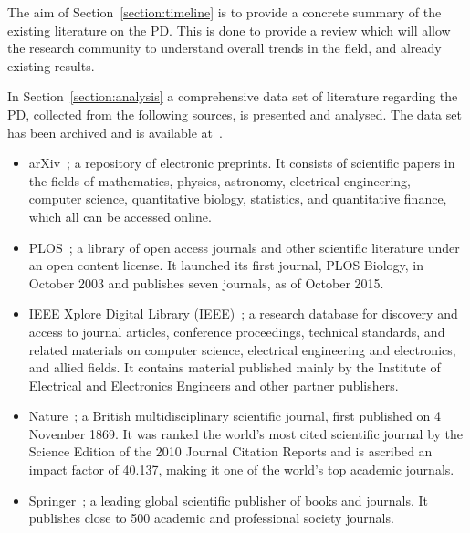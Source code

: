 \documentclass{article}
\theoremstyle{definition}
\begin{document}
The aim of Section~\ref{section:timeline} is to provide a concrete summary of
the existing literature on the PD. This is done to provide a review which will
allow the research community to understand overall trends in the field, and
already existing results.

In Section~\ref{section:analysis} a comprehensive data set of literature
regarding the PD, collected from the following sources, is presented and
analysed. The data set has been archived and is available at~\cite{pd_data_2018}.

\begin{multicols}{2}
    \begin{itemize}
        \item arXiv~\cite{mckiernan2000}; a repository of electronic preprints.
        It consists of scientific
        papers in the fields of mathematics, physics, astronomy, electrical engineering,
        computer science, quantitative biology, statistics, and quantitative finance,
        which all can be accessed online.
        \item PLOS~\cite{plos}; a library of open access journals and other scientific literature
        under an open content license. It launched its first journal, PLOS Biology,
        in October 2003 and publishes seven journals, as of October 2015.
        \item IEEE Xplore Digital Library (IEEE)~\cite{ieee}; a research database for discovery
        and access to journal articles, conference proceedings, technical standards,
        and related materials on computer science, electrical engineering and electronics,
        and allied fields. It contains material published mainly by the Institute of
        Electrical and Electronics Engineers and other partner publishers. 
        \item Nature~\cite{nature}; a British multidisciplinary scientific journal,
        first published on 4 November 1869. It was ranked the world's most cited
        scientific journal by the Science Edition of the 2010 Journal Citation Reports
        and is ascribed an impact factor of 40.137, making it one of the world's
        top academic journals.
        \item Springer~\cite{springer}; a leading global scientific publisher of
        books and journals. It publishes close to 500 academic and professional
        society journals.
    \end{itemize}
\end{multicols}
\end{document}

